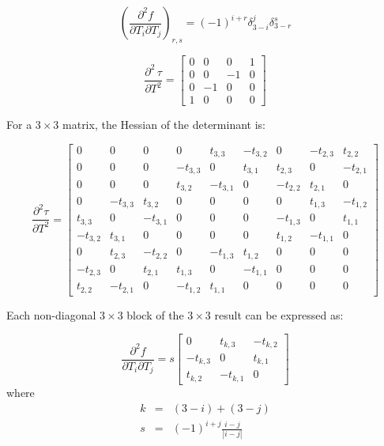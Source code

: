 \documentclass{report}
\begin{document}
\begin{equation}
\left(\frac{\partial^2 f}{\partial T_i \partial T_j}\right)_{r,s} =
(-1)^{i+r} \delta_{3-i}^j \delta_{3-r}^s
\end{equation}

\begin{equation}
\label{2ndtau2d}
\frac{\partial^2 \, \tau}{\partial T^2} =
\left[ \begin{array}{cccc}
0 & 0 & 0 & 1 \\
0 & 0 & -1 & 0 \\
0 & -1 & 0 & 0 \\
1 & 0 & 0 & 0 
\end{array} \right]
\end{equation}

\noindent For a $3 \times 3$ matrix, the Hessian of the determinant is:

\begin{equation}
\label{2ndtau3d}
\frac{\partial^2 \tau}{\partial T^2} =
\left[ \begin{array}{ccccccccc}
 0 & 0 & 0 & 0 & t_{3,3} & -t_{3,2} & 0 & -t_{2,3} & t_{2,2} \\
 0 & 0 & 0 & -t_{3,3} & 0 & t_{3,1} & t_{2,3} & 0 & -t_{2,1} \\
 0 & 0 & 0 & t_{3,2} & -t_{3,1} & 0 & -t_{2,2} & t_{2,1} & 0 \\
 0 & -t_{3,3} & t_{3,2} & 0 & 0 & 0 & 0 & t_{1,3} & -t_{1,2} \\
 t_{3,3} & 0 & -t_{3,1} & 0 & 0 & 0 & -t_{1,3} & 0 & t_{1,1} \\
 -t_{3,2} & t_{3,1} & 0 & 0 & 0 & 0 & t_{1,2} & -t_{1,1} & 0 \\
 0 & t_{2,3} & -t_{2,2} & 0 & -t_{1,3} & t_{1,2} & 0 & 0 & 0 \\
 -t_{2,3} & 0 & t_{2,1} & t_{1,3} & 0 & -t_{1,1} & 0 & 0 & 0 \\
 t_{2,2} & -t_{2,1} & 0 & -t_{1,2} & t_{1,1} & 0 & 0 & 0 & 0
\end{array} \right]
\end{equation}

\noindent Each non-diagonal $3 \times 3$ block of the $3 \times 3$ result can be expressed as:

\begin{equation}
\label{3dtauhessblock}
\frac{\partial^2 f}{\partial T_i \partial T_j}
 = s\left[\begin{array}{ccc}
0 & t_{k,3} & -t_{k,2} \\
-t_{k,3} & 0 & t_{k,1} \\
t_{k,2} & -t_{k,1} & 0 
\end{array}\right]\end{equation}
where 
\begin{eqnarray}
k &=& (3-i) + (3-j) \\
s &=& (-1)^{i+j}\frac{i-j}{|i-j|}
\end{eqnarray}
\end{document}
